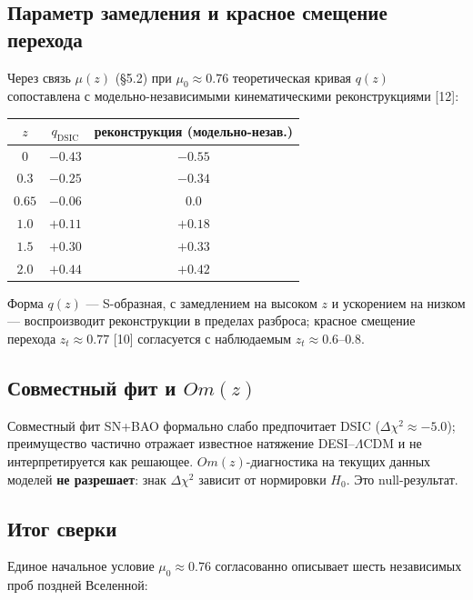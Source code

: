 \documentclass{article}
\begin{document}
\subsection{Параметр замедления и красное смещение перехода}

Через связь $\mu(z)$ (\S5.2) при $\mu_0 \approx 0.76$ теоретическая кривая $q(z)$ сопоставлена с модельно-независимыми кинематическими реконструкциями [12]:

\begin{table}[htbp]
\centering
\small
\begin{tabular}{@{}ccc@{}}
\toprule
$z$ & $q_{\text{DSIC}}$ & \textbf{реконструкция (модельно-незав.)} \\
\midrule
$0$ & $-0.43$ & $-0.55$ \\
$0.3$ & $-0.25$ & $-0.34$ \\
$0.65$ & $-0.06$ & $0.0$ \\
$1.0$ & $+0.11$ & $+0.18$ \\
$1.5$ & $+0.30$ & $+0.33$ \\
$2.0$ & $+0.44$ & $+0.42$ \\
\bottomrule
\end{tabular}
\end{table}

Форма $q(z)$ --- S-образная, с замедлением на высоком $z$ и ускорением на низком --- воспроизводит реконструкции в пределах разброса; красное смещение перехода $z_t \approx 0.77$ [10] согласуется с наблюдаемым $z_t \approx 0.6\text{--}0.8$.

\subsection{Совместный фит и $Om(z)$}

Совместный фит SN+BAO формально слабо предпочитает DSIC ($\Delta\chi^2 \approx -5.0$); преимущество частично отражает известное натяжение DESI--$\Lambda$CDM и не интерпретируется как решающее. $Om(z)$-диагностика на текущих данных моделей \textbf{не разрешает}: знак $\Delta\chi^2$ зависит от нормировки $H_0$. Это null-результат.

\subsection{Итог сверки}

Единое начальное условие $\mu_0 \approx 0.76$ согласованно описывает шесть независимых проб поздней Вселенной:
\end{document}
